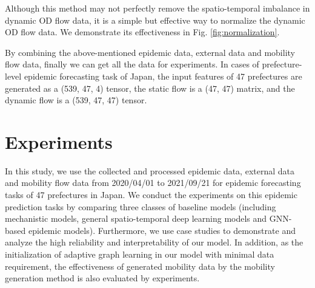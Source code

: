 \documentclass[lettersize,journal]{IEEEtran}
\begin{document}
Although this method may not perfectly remove the spatio-temporal imbalance in dynamic OD flow data, it is a simple but effective way to normalize the dynamic OD flow data. We demonstrate its effectiveness in Fig. \ref{fig:normalization}.

By combining the above-mentioned epidemic data, external data and mobility flow data, finally we can get all the data for experiments. In cases of prefecture-level epidemic forecasting task of Japan, the input features of 47 prefectures are generated as a (539, 47, 4) tensor, the static flow is a (47, 47) matrix, and the dynamic flow is a (539, 47, 47) tensor. 

\section{Experiments}\label{sec:experiment}
In this study, we use the collected and processed epidemic data, external data and mobility flow data from 2020/04/01 to 2021/09/21 for epidemic forecasting tasks of 47 prefectures in Japan. We conduct the experiments on this epidemic prediction tasks by comparing three classes of baseline models (including mechanistic models, general spatio-temporal deep learning models and GNN-based epidemic models). Furthermore, we use case studies to demonstrate and analyze the high reliability and interpretability of our model. In addition, as the initialization of adaptive graph learning in our model with minimal data requirement, the effectiveness of generated mobility data by the mobility generation method is also evaluated by experiments.
\end{document}
